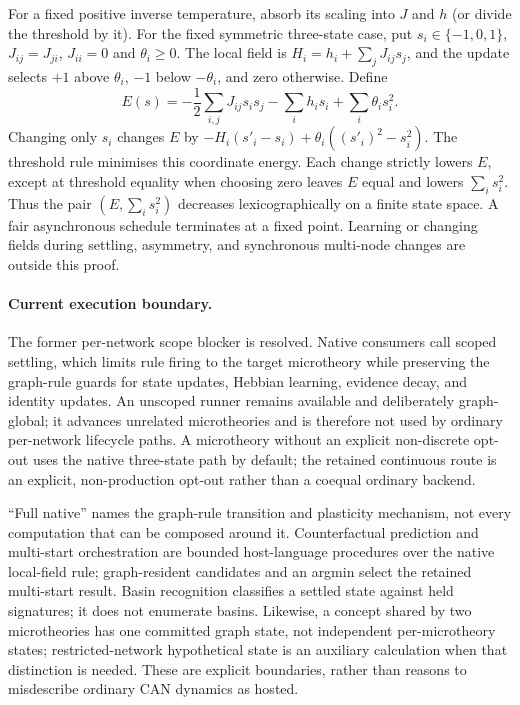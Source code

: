 \documentclass[11pt,a4paper]{article}
\theoremstyle{remark}
\begin{document}
For a fixed positive inverse temperature, absorb its scaling into $J$ and $h$ (or divide the threshold by it). For the fixed symmetric three-state case, put $s_i\in\{-1,0,1\}$,
$J_{ij}=J_{ji}$, $J_{ii}=0$ and $\theta_i\ge0$. The local field is
$H_i=h_i+\sum_jJ_{ij}s_j$, and the update selects $+1$ above $\theta_i$,
$-1$ below $-\theta_i$, and zero otherwise. Define
\[
E(s)=-\frac12\sum_{i,j}J_{ij}s_is_j-\sum_i h_i s_i
       +\sum_i\theta_i s_i^2.
\]
Changing only $s_i$ changes $E$ by
$-H_i(s'_i-s_i)+\theta_i((s'_i)^2-s_i^2)$. The threshold rule
minimises this coordinate energy. Each change strictly lowers $E$, except
at threshold equality when choosing zero leaves $E$ equal and lowers
$\sum_i s_i^2$. Thus the pair $(E,\sum_i s_i^2)$ decreases
lexicographically on a finite state space. A fair asynchronous schedule
terminates at a fixed point. Learning or changing fields during settling,
asymmetry, and synchronous multi-node changes are outside this proof.



\paragraph{Current execution boundary.} The former per-network scope blocker is resolved. Native
consumers call scoped settling, which limits rule firing to the target microtheory while preserving
the graph-rule guards for state updates, Hebbian learning, evidence decay, and identity updates. An
unscoped runner remains available and deliberately graph-global; it advances unrelated microtheories
and is therefore not used by ordinary per-network lifecycle paths. A microtheory without an explicit
non-discrete opt-out uses the native three-state path by default; the retained continuous route is an
explicit, non-production opt-out rather than a coequal ordinary backend.

``Full native'' names the graph-rule transition and plasticity mechanism, not every computation that
can be composed around it. Counterfactual prediction and multi-start orchestration are bounded
host-language procedures over the native local-field rule; graph-resident candidates and an argmin
select the retained multi-start result. Basin recognition classifies a settled state against held
signatures; it does not enumerate basins. Likewise, a concept shared by two microtheories has one
committed graph state, not independent per-microtheory states; restricted-network hypothetical state is
an auxiliary calculation when that distinction is needed. These are explicit boundaries, rather than
reasons to misdescribe ordinary CAN dynamics as hosted.
\end{document}
